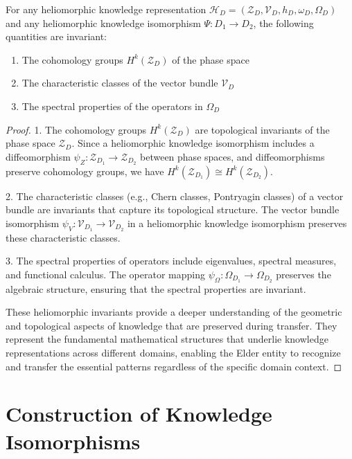 \begin{theorem}
For any heliomorphic knowledge representation $\mathcal{H}_D = (\mathcal{Z}_D, \mathcal{V}_D, h_D, \omega_D, \Omega_D)$ and any heliomorphic knowledge isomorphism $\Psi: D_1 \to D_2$, the following quantities are invariant:
\begin{enumerate}
    \item The cohomology groups $H^k(\mathcal{Z}_D)$ of the phase space
    \item The characteristic classes of the vector bundle $\mathcal{V}_D$
    \item The spectral properties of the operators in $\Omega_D$
\end{enumerate}
\end{theorem}

\begin{proof}
1. The cohomology groups $H^k(\mathcal{Z}_D)$ are topological invariants of the phase space $\mathcal{Z}_D$. Since a heliomorphic knowledge isomorphism includes a diffeomorphism $\psi_Z: \mathcal{Z}_{D_1} \to \mathcal{Z}_{D_2}$ between phase spaces, and diffeomorphisms preserve cohomology groups, we have $H^k(\mathcal{Z}_{D_1}) \cong H^k(\mathcal{Z}_{D_2})$.

2. The characteristic classes (e.g., Chern classes, Pontryagin classes) of a vector bundle are invariants that capture its topological structure. The vector bundle isomorphism $\psi_V: \mathcal{V}_{D_1} \to \mathcal{V}_{D_2}$ in a heliomorphic knowledge isomorphism preserves these characteristic classes.

3. The spectral properties of operators include eigenvalues, spectral measures, and functional calculus. The operator mapping $\psi_{\Omega}: \Omega_{D_1} \to \Omega_{D_2}$ preserves the algebraic structure, ensuring that the spectral properties are invariant.

These heliomorphic invariants provide a deeper understanding of the geometric and topological aspects of knowledge that are preserved during transfer. They represent the fundamental mathematical structures that underlie knowledge representations across different domains, enabling the Elder entity to recognize and transfer the essential patterns regardless of the specific domain context.
\end{proof}

\section{Construction of Knowledge Isomorphisms}

